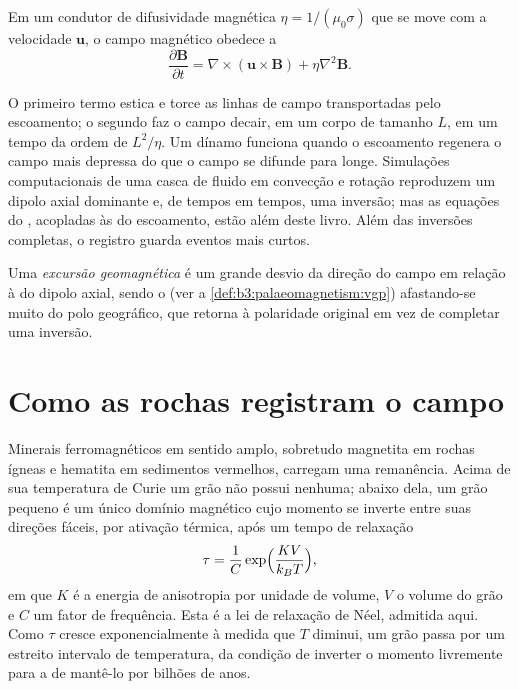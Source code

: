 \begin{proposition}\label{prop:b3:palaeomagnetism:induction}
Em um condutor de difusividade magnética $\eta = 1/(\mu_0\sigma)$ que se move com a
velocidade $\mathbf u$, o campo magnético obedece a
\[
  \frac{\partial\mathbf B}{\partial t} = \nabla\times(\mathbf u\times\mathbf B)
  + \eta\nabla^2\mathbf B .
\]
\end{proposition}
\admitted

O primeiro termo estica e torce as linhas de campo transportadas pelo escoamento; o
segundo faz o campo decair, em um corpo de tamanho $L$, em um tempo da ordem de
$L^2/\eta$. Um dínamo funciona quando o escoamento regenera o campo mais depressa do que
o campo se difunde para longe. Simulações computacionais de uma casca de fluido em convecção e rotação
reproduzem um dipolo axial dominante e, de tempos em tempos, uma inversão; mas as
equações do , acopladas às do escoamento, estão além deste
livro. Além das inversões completas, o registro guarda eventos mais curtos.

\begin{definition}\label{def:b3:palaeomagnetism:excursion}
Uma \emph{excursão geomagnética} é um grande
desvio da direção do campo em relação à do dipolo axial, sendo o
 (ver a \cref{def:b3:palaeomagnetism:vgp}) afastando-se muito
do polo geográfico, que retorna à polaridade original em vez de
completar uma inversão.
\end{definition}

\section{Como as rochas registram o campo}

Minerais ferromagnéticos em sentido amplo, sobretudo magnetita em rochas ígneas
e hematita em sedimentos vermelhos, carregam uma remanência. Acima de sua temperatura de Curie
um grão não possui nenhuma; abaixo dela, um grão pequeno é um único domínio magnético cujo
momento se inverte entre suas direções fáceis, por ativação térmica, após um
tempo de relaxação
\[
  \tau = \frac1C\exp\Bigl(\frac{K V}{k_B T}\Bigr),
\]
em que $K$ é a energia de anisotropia por unidade de volume, $V$ o volume do grão
e $C$ um fator de frequência. Esta é a lei de relaxação de Néel, admitida aqui. Como
$\tau$ cresce exponencialmente à medida que $T$ diminui, um grão passa por um estreito intervalo
de temperatura, da condição de inverter o momento livremente para a de mantê-lo por bilhões de
anos.


